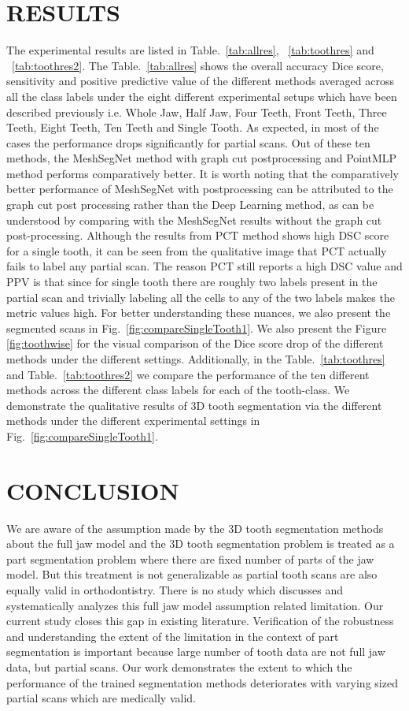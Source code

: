 \documentclass[letterpaper, 10 pt, conference]{ieeeconf}  %
\begin{document}
\section{RESULTS}
The experimental results  are listed in Table.~\ref{tab:allres}, ~\ref{tab:toothres} and ~\ref{tab:toothres2}. The Table.~\ref{tab:allres} shows the overall accuracy Dice score, sensitivity and positive predictive value of the different methods averaged across all the class labels under the eight different experimental setups which have been described previously i.e. Whole Jaw, Half Jaw, Four Teeth, Front Teeth, Three Teeth, Eight Teeth, Ten Teeth and Single Tooth. As expected, in most of the cases the performance drops significantly for partial scans. Out of these ten methods, the MeshSegNet method with graph cut postprocessing and PointMLP method performs comparatively better. It is worth noting that the comparatively better performance of MeshSegNet with postprocessing can be attributed to the graph cut post processing rather than the  Deep Learning method, as can be understood by comparing with the MeshSegNet results without the graph cut post-processing. Although the results from PCT method shows high DSC score for a single tooth, it can be seen from the qualitative image that PCT actually fails to label any partial scan. The reason PCT still reports a high DSC value and PPV is that since for single tooth there are roughly two labels present in the partial scan and trivially labeling all the cells to any of the two labels makes the metric values high. For better understanding these nuances, we also present the segmented scans in Fig.~\ref{fig:compareSingleTooth1}. We also present the Figure \ref{fig:toothwise} for the visual comparison of the Dice score drop of the different methods under the different settings. Additionally, in the Table.~\ref{tab:toothres} and Table.~\ref{tab:toothres2}  we compare the performance of the ten different methods across the different class labels for each of the tooth-class. We demonstrate the qualitative results of 3D tooth segmentation via the different methods under the different experimental settings in Fig.~\ref{fig:compareSingleTooth1}. 


\section{CONCLUSION}
We are aware of the assumption made by the 3D tooth segmentation methods about the full jaw model and the 3D tooth segmentation problem is treated
as a part segmentation problem where there are fixed number of parts of the jaw model. But this treatment is not generalizable as partial tooth scans are also equally valid in orthodontistry. There is no study which discusses and systematically analyzes this full jaw model assumption related limitation. Our current study closes this gap in existing literature. Verification of the robustness and understanding the extent of the limitation in the context of part segmentation is important because large number of tooth data are not full jaw data, but partial scans. Our work demonstrates the extent to which the performance of the trained segmentation methods deteriorates with varying sized partial scans which are medically valid.
\end{document}
